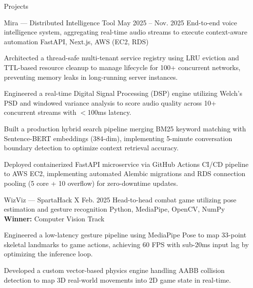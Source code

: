 \documentclass[
	11pt
]{../resume}
\begin{document}
	\begin{rSection}{P}{rojects}
		\begin{rSectionEntry}
			{Mira --- Distributed Intelligence Tool}
			{May 2025 -- Nov. 2025}
			{End-to-end voice intelligence system, aggregating real-time audio streams to execute context-aware automation}
			{FastAPI, Next.js, AWS (EC2, RDS)}
			{}

			\item Architected a thread-safe multi-tenant service registry using LRU eviction and TTL-based resource cleanup to manage lifecycle for 100+ concurrent networks, preventing memory leaks in long-running server instances.
			\item Engineered a real-time Digital Signal Processing (DSP) engine utilizing Welch's PSD and windowed variance analysis to score audio quality across 10+ concurrent streams with $<$100ms latency.
			\item Built a production hybrid search pipeline merging BM25 keyword matching with Sentence-BERT embeddings (384-dim), implementing 5-minute conversation boundary detection to optimize context retrieval accuracy.
			\item Deployed containerized FastAPI microservice via GitHub Actions CI/CD pipeline to AWS EC2, implementing automated Alembic migrations and RDS connection pooling (5 core + 10 overflow) for zero-downtime updates.
		\end{rSectionEntry}

		\begin{rSectionEntry}
			{WizViz --- SpartaHack X}
			{Feb. 2025}
			{Head-to-head combat game utilizing pose estimation and gesture recognition}
			{Python, MediaPipe, OpenCV, NumPy}
			{\textbf{Winner:} Computer Vision Track}

			\item Engineered a low-latency gesture pipeline using MediaPipe Pose to map 33-point skeletal landmarks to game actions, achieving 60 FPS with sub-20ms input lag by optimizing the inference loop.
			\item Developed a custom vector-based physics engine handling AABB collision detection to map 3D real-world movements into 2D game state in real-time.
		\end{rSectionEntry}
	\end{rSection}
\end{document}

